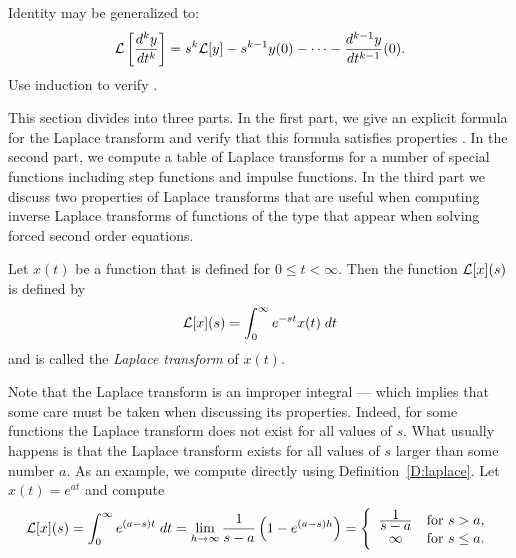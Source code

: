\begin{exercise}   \label{exer:kderLap}
Identity  may be 
generalized to: 
\begin{equation}  \label{LapDerk}
{\cal L}\left[\frac{d^k y}{dt^k}\right] =
s^k{\cal L}[y] - s^{k-1} y(0) - \cdots - \frac{d^{k-1} y}{dt^{k-1}}(0).
\end{equation}
Use induction to verify . 
\end{exercise}


 \label{S:13.3}

This section divides into three parts.  In the first part, we give an explicit 
formula for the Laplace transform and verify that this formula satisfies 
properties .  In the second part, we compute a table of Laplace
transforms for a number of special functions including step functions and
impulse functions.  In the third part we discuss two properties of Laplace
transforms that are useful when computing inverse Laplace transforms of
functions of the type that appear when solving forced second order equations.

\begin{Def}  \label{D:laplace}
Let $x(t)$ be a function that is defined for $0\le t < \infty$.
Then the function ${\cal L}[x](s)$ is defined by
\begin{equation} \label{E:laplace}
{\cal L}[x](s) = \int_0^{\infty} e^{-st} x(t)\; dt
\end{equation}
and is called the {\em Laplace transform\/} of $x(t)$.
\end{Def}

Note that the Laplace transform is an improper 
integral --- which implies that some care must be taken when discussing 
its properties.  Indeed, for some functions the Laplace transform does 
not exist for all values of $s$.  What usually happens is that 
the Laplace transform exists for all values of $s$ larger than some 
number $a$.  As an example, we compute  directly using 
Definition~\ref{D:laplace}.  Let $x(t)=e^{at}$ and compute 
\begin{equation}  \label{e:expat}
{\cal L}[x](s) = \int_0^{\infty} e^{(a-s)t}\; dt=
\lim\limits_{h\to \infty} \frac{1}{s-a}\left( 1-e^{(a-s)h} \right)
=\left\{ \begin{array}{cl} \frac{\displaystyle 1}{\displaystyle s-a} & \mbox{for $s>a$,}\\
\infty & \mbox{for $s\le a$.}\end{array}\right.
\end{equation}

